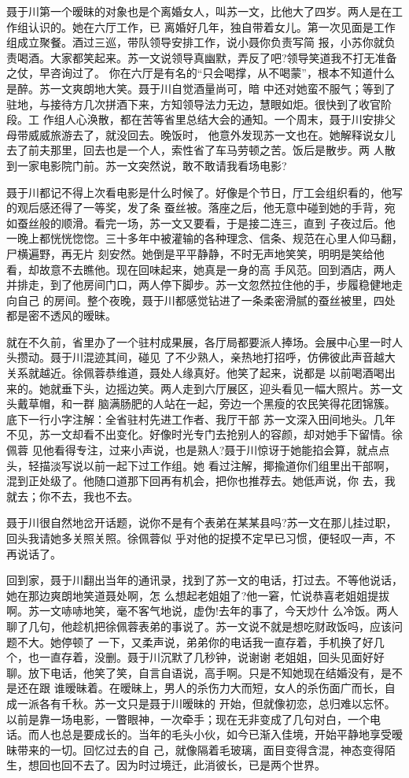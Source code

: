 \documentclass[11pt,a4paper,onecolumn]{article}
\begin{document}
聂于川第一个暧昧的对象也是个离婚女人，叫苏一文，比他大了四岁。两人是在工作组认识的。她在六厅工作，已
离婚好几年，独自带着女儿。第一次见面是工作组成立聚餐。酒过三巡，带队领导安排工作，说小聂你负责写简
报，小苏你就负责喝酒。大家都笑起来。苏一文说领导真幽默，弄反了吧?领导笑道我不打无准备之仗，早咨询过了。
你在六厅是有名的“只会喝撑，从不喝蒙”，根本不知道什么是醉。苏一文爽朗地大笑。聂于川自觉酒量尚可，暗
中还对她蛮不服气；等到了驻地，与接待方几次拼酒下来，方知领导法力无边，慧眼如炬。很快到了收官阶段。工
作组人心涣散，都在苦等省里总结大会的通知。一个周末，聂于川安排父母带威威旅游去了，就没回去。晚饭时，
他意外发现苏一文也在。她解释说女儿去了前夫那里，回去也是一个人，索性省了车马劳顿之苦。饭后是散步。两
人散到一家电影院门前。苏一文突然说，敢不敢请我看场电影?

聂于川都记不得上次看电影是什么时候了。好像是个节日，厅工会组织看的，他写的观后感还得了一等奖，发了条
蚕丝被。落座之后，他无意中碰到她的手背，宛如蚕丝般的顺滑。看完一场，苏一文又要看，于是接二连三，直到
子夜过后。他一晚上都恍恍惚惚。三十多年中被灌输的各种理念、信条、规范在心里人仰马翻，尸横遍野，再无片
刻安然。她倒是平平静静，不时无声地笑笑，明明是笑给他看，却故意不去瞧他。现在回味起来，她真是一身的高
手风范。回到酒店，两人并排走，到了他房间门口，两人停下脚步。苏一文忽然拉住他的手，步履稳健地走向自己
的房间。整个夜晚，聂于川都感觉钻进了一条柔密滑腻的蚕丝被里，四处都是密不透风的暧昧。

就在不久前，省里办了一个驻村成果展，各厅局都要派人捧场。会展中心里一时人头攒动。聂于川混迹其间，碰见
了不少熟人，亲热地打招呼，仿佛彼此声音越大关系就越近。徐佩蓉恭维道，聂处人缘真好。他笑了起来，说都是
以前喝酒喝出来的。她就垂下头，边摇边笑。两人走到六厅展区，迎头看见一幅大照片。苏一文头戴草帽，和一群
脑满肠肥的人站在一起，旁边一个黑瘦的农民笑得花团锦簇。底下一行小字注解：全省驻村先进工作者、我厅干部
苏一文深入田间地头。几年不见，苏一文却看不出变化。好像时光专门去抢别人的容颜，却对她手下留情。徐佩蓉
见他看得专注，过来小声说，也是熟人?聂于川惊讶于她能掐会算，就点点头，轻描淡写说以前一起下过工作组。她
看过注解，揶揄道你们组里出干部啊，混到正处级了。他随口道那下回再有机会，把你也推荐去。她低声说，你
去，我就去；你不去，我也不去。

聂于川很自然地岔开话题，说你不是有个表弟在某某县吗?苏一文在那儿挂过职，回头我请她多关照关照。徐佩蓉似
乎对他的捉摸不定早已习惯，便轻叹一声，不再说话了。

回到家，聂于川翻出当年的通讯录，找到了苏一文的电话，打过去。不等他说话，她在那边爽朗地笑道聂处啊，怎
么想起老姐姐了?他一窘，忙说恭喜老姐姐提拔啊。苏一文哧哧地笑，毫不客气地说，虚伪!去年的事了，今天炒什
么冷饭。两人聊了几句，他趁机把徐佩蓉表弟的事说了。苏一文说不就是想吃财政饭吗，应该问题不大。她停顿了
一下，又柔声说，弟弟你的电话我一直存着，手机换了好几个，也一直存着，没删。聂于川沉默了几秒钟，说谢谢
老姐姐，回头见面好好聊。放下电话，他笑了笑，自言自语说，高手啊。只是不知她现在结婚没有，是不是还在跟
谁暧昧着。在暧昧上，男人的杀伤力大而短，女人的杀伤面广而长，自成一派各有千秋。苏一文只是聂于川暧昧的
开始，但就像初恋，总归难以忘怀。以前是靠一场电影，一瞥眼神，一次牵手；现在无非变成了几句对白，一个电
话。而人也总是要成长的。当年的毛头小伙，如今已渐入佳境，开始平静地享受暧昧带来的一切。回忆过去的自
己，就像隔着毛玻璃，面目变得含混，神态变得陌生，想回也回不去了。因为时过境迁，此消彼长，已是两个世界。
\end{document}
